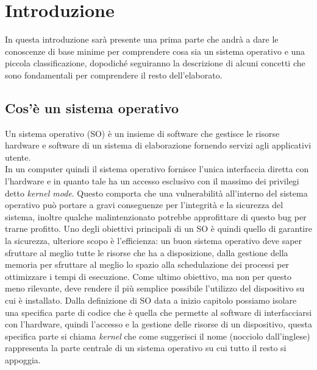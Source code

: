\chapter{Introduzione}
In questa introduzione sarà presente una prima parte che andrà a dare le conoscenze di base minime per comprendere cosa sia un sistema operativo e una piccola classificazione, dopodiché seguiranno la descrizione di alcuni concetti che sono fondamentali per comprendere il resto dell'elaborato.

\section{Cos'è un sistema operativo}
Un sistema operativo (SO) è un insieme di software che gestisce le risorse hardware e software di un sistema di elaborazione fornendo servizi agli applicativi utente.\\
In un computer quindi il sistema operativo fornisce l'unica interfaccia diretta con l'hardware e in quanto tale ha un accesso esclusivo con il massimo dei privilegi detto \textit{kernel mode}. Questo comporta che una vulnerabilità all'interno del sistema operativo può portare a gravi conseguenze per l'integrità e la sicurezza del sistema, inoltre qualche malintenzionato potrebbe approfittare di questo bug per trarne profitto.
Uno degli obiettivi principali di un SO è quindi quello di garantire la sicurezza, ulteriore scopo è l'efficienza: un buon sistema operativo deve saper sfruttare al meglio tutte le risorse che ha a disposizione, dalla gestione della memoria per sfruttare al meglio lo spazio alla schedulazione dei processi per ottimizzare i tempi di esecuzione. Come ultimo obiettivo, ma non per questo meno rilevante, deve rendere il più semplice possibile l'utilizzo del dispositivo su cui è installato.
Dalla definizione di SO data a inizio capitolo possiamo isolare una specifica parte di codice che è quella che permette al software di interfacciarsi con l'hardware, quindi l'accesso e la gestione delle risorse di un dispositivo, questa specifica parte si chiama \textit{kernel} che come suggerisci il nome (nocciolo dall'inglese) rappresenta la parte centrale di un sistema operativo su cui tutto il resto si appoggia.
\newpage

